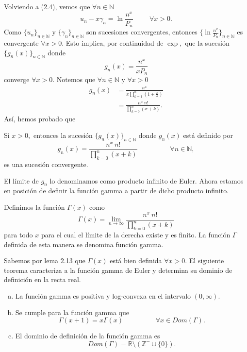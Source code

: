 Volviendo a (2.4), vemos que $\forall n \in \mathbb{N}$ $$u_n-x\gamma_n = \ln \frac{n^x}{P_n}\hspace{1cm}\forall x > 0.$$ Como $\{u_n\}_{n \in \mathbb{N}}$ y $\{\gamma_n\}_{n \in \mathbb{N}}$ son sucesiones convergentes, entonces $\{\ln \frac{n^x}{P_n}\}_{n \in \mathbb{N}}$ es convergente $\forall x > 0.$ Esto implica, por continuidad de $\exp,$ que la sucesión $\{g_n(x)\}_{n \in \mathbb{N}}$ donde $$g_n(x) = \frac{n^x}{xP_n}$$ converge $\forall x > 0.$ Notemos que $\forall n \in \mathbb{N}$ y $\forall x > 0$
\begin{align*}
g_n(x) &= \frac{n^x}{x\prod_{k = 1}^{n}\left(1+\frac{x}{k}\right)}\\
&= \frac{n^x\ n!}{\prod_{k = 0}^{n}(x+k)}.
\end{align*}
Así, hemos probado que
\begin{lemma}
	Si $x > 0,$ entonces la sucesión $\{g_n(x)\}_{n \in \mathbb{N}}$ donde $g_n(x)$ está definido por
	\begin{equation}
	g_n(x) = \frac{n^x\ n!}{\prod_{k = 0}^{n}(x+k)}\hspace{2cm}\forall n \in \mathbb{N},
	\end{equation}
	es una sucesión convergente.
\end{lemma}
El límite de $g_n$ lo denominamos como producto infinito de Euler. Ahora estamos en posición de definir la función gamma a partir de dicho producto infinito.
\begin{definition}
	Definimos la función $\Gamma(x)$ como
	\begin{equation}
	\Gamma(x) = \lim_{n \rightarrow \infty}\frac{n^x\ n!}{\prod_{k = 0}^{n}(x+k)}
	\end{equation}
	para todo $x$ para el cual el límite de la derecha existe y es finito. La función $\Gamma$ definida de esta manera se denomina función gamma.
\end{definition}
Sabemos por lema 2.13 que $\Gamma(x)$ está bien definida $\forall x > 0.$ El siguiente teorema caracteriza a la función gamma de Euler y determina su dominio de definición en la recta real.
\begin{theorem}
	\begin{enumerate}[(a)]
		\item La función gamma es positiva y log-convexa en el intervalo $(0,\infty).$
		\item Se cumple para la función gamma que
		\begin{equation}
		\Gamma(x+1) = x\Gamma(x)\hspace{2cm}\forall x \in Dom(\Gamma).
		\end{equation}
		\item El dominio de definición de la función gamma es $$Dom(\Gamma) = \mathbb{R}\texttt{\textbackslash}(\mathbb{Z}^-\cup \{0\}).$$
	\end{enumerate}
\end{theorem}
